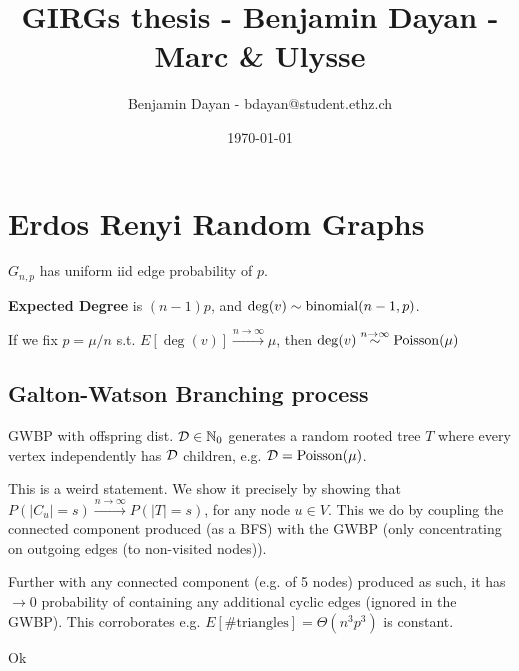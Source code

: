 \documentclass[a4paper]{article}
\title{GIRGs thesis - Benjamin Dayan - Marc \& Ulysse }
\author{Benjamin Dayan - bdayan@student.ethz.ch}
\date{\today}
\newcommand{\ntoinf}{n \to \infty}
\newcommand{\ntoisr}[1]{\stackrel{\ntoinf}{#1}}
\begin{document}
{\let\clearpage\relax \maketitle}
{\let\clearpage\relax \tableofcontents} 

\section{Erdos Renyi Random Graphs}
$G_{n,p}$ has uniform iid edge probability of $p$.

\textbf{Expected Degree} is $(n-1)p$, and $\deg(v) \sim \operatorname{binomial}(n-1, p)$.

If we fix $p = \mu/n$ s.t. $E[\deg(v)] \stackrel{n \to \infty}{\to} \mu$,
then $\deg(v) \stackrel{n \to \infty}{\sim} \operatorname{Poisson}(\mu)$

\subsection{Galton-Watson Branching process}
GWBP with offspring dist. $\mathcal{D} \in \mathbb{N}_0$ generates a random rooted tree $T$ where every vertex independently has 
$\mathcal{D}$ children, e.g. $\mathcal{D} = \operatorname{Poisson}(\mu)$.

\begin{comment}
Question on Thm 2.3: Why cannot we just show that for any given vertex $u$, denoting $C_u$ as its connected
component, that $P(|C_u| = s) \ntoisr{\to} P(|T| = s)$?

Answer: Yes it was immediately in the next lines of the notes :P
\end{comment}
\begin{thm}
This is a weird statement. We show it precisely by showing that
$P(|C_u| = s) \ntoisr{\to} P(|T| = s)$, for any node $u \in V$.
This we do by coupling the connected component produced (as a BFS)
with the GWBP (only concentrating on outgoing edges (to non-visited nodes)).

Further with any connected component (e.g. of 5 nodes) produced as such,
it has $\to 0$ probability of containing any additional cyclic edges (ignored in the GWBP).
This corroborates e.g. $E[\# \text{triangles}] = \Theta(n^3 p^3)$ is constant.
\end{thm}

Ok
\end{document}
